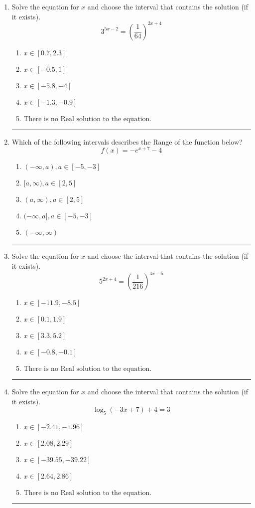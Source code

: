 \documentclass[14pt]{extbook}
\newcommand{\litem}[1]{\item#1\hspace*{-1cm}\rule{\textwidth}{0.4pt}}
\begin{document}
\begin{enumerate}
\litem{
Solve the equation for $x$ and choose the interval that contains the solution (if it exists).\[ 3^{5x-2} = \left(\frac{1}{64}\right)^{2x+4} \]\begin{enumerate}[label=\Alph*.]
\item \( x \in [0.7, 2.3] \)
\item \( x \in [-0.5, 1] \)
\item \( x \in [-5.8, -4] \)
\item \( x \in [-1.3, -0.9] \)
\item \( \text{There is no Real solution to the equation.} \)

\end{enumerate} }
\litem{
Which of the following intervals describes the Range of the function below?\[ f(x) = -e^{x+7}-4 \]\begin{enumerate}[label=\Alph*.]
\item \( (-\infty, a), a \in [-5, -3] \)
\item \( [a, \infty), a \in [2, 5] \)
\item \( (a, \infty), a \in [2, 5] \)
\item \( (-\infty, a], a \in [-5, -3] \)
\item \( (-\infty, \infty) \)

\end{enumerate} }
\litem{
Solve the equation for $x$ and choose the interval that contains the solution (if it exists).\[ 5^{2x+4} = \left(\frac{1}{216}\right)^{4x-5} \]\begin{enumerate}[label=\Alph*.]
\item \( x \in [-11.9, -8.5] \)
\item \( x \in [0.1, 1.9] \)
\item \( x \in [3.3, 5.2] \)
\item \( x \in [-0.8, -0.1] \)
\item \( \text{There is no Real solution to the equation.} \)

\end{enumerate} }
\litem{
Solve the equation for $x$ and choose the interval that contains the solution (if it exists).\[ \log_{5}{(-3x+7)}+4 = 3 \]\begin{enumerate}[label=\Alph*.]
\item \( x \in [-2.41, -1.96] \)
\item \( x \in [2.08, 2.29] \)
\item \( x \in [-39.55, -39.22] \)
\item \( x \in [2.64, 2.86] \)
\item \( \text{There is no Real solution to the equation.} \)


\end{enumerate}}
\end{enumerate}
\end{document}
